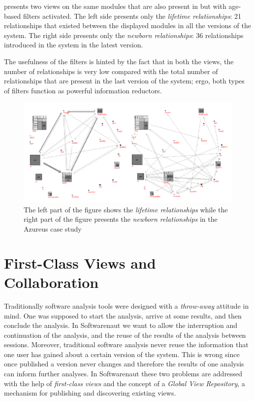 \documentclass[preprint,12pt]{elsarticle}
\begin{document}
 presents two views on the same modules that are also present in  but with age-based filters activated. 
The left side presents only the {\em lifetime relationships}: 21 relationships that existed between the displayed modules in all the versions of the system. The right side presents only the {\em newborn relationships}: 36 relationships introduced in the system in the latest version. 

The usefulness of the filters is hinted by the fact that in both the views, the number of relationships is very low compared with the total number of relationships that are present in the last version of the system; ergo, both types of filters function as powerful information reductors.

\begin{figure}
\begin{center}
\includegraphics[width=\linewidth]{Architecture-LifetimeVsRecent}
\caption{The left part of the figure shows the {\em lifetime relationships} while the right part of the figure presents the {\em newborn relationships} in the Azureus case study}
\end{center}
\end{figure}



\newpage
\section {First-Class Views and Collaboration}


Traditionally software analysis tools were designed with a {\em throw-away} attitude  in mind. One was supposed to start the analysis, arrive at some results, and then conclude the analysis. In Softwarenaut we want to allow the interruption and continuation of the analysis, and the reuse of the results of the analysis between sessions. Moreover, traditional software analysis never reuse the information that one user has gained about a certain version of the system. This is wrong since once published a version never changes and therefore the results of one analysis can inform further analyses. 
In Softwarenaut these two problems are addressed with the help of {\em first-class views} and the concept of a {\em Global View Repository}, a mechanism for publishing and discovering existing views.
\end{document}
